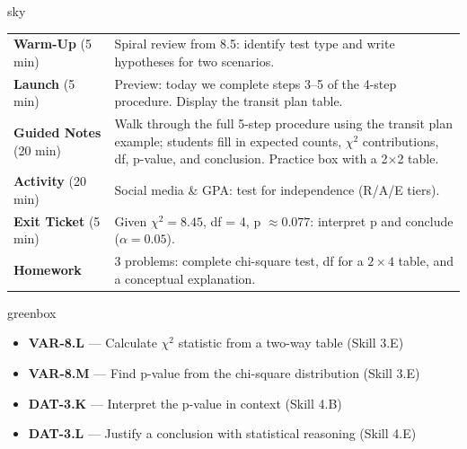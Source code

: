 \documentclass[10pt]{article}
\begin{document}
\begin{skillbox}{sky}
\renewcommand{\arraystretch}{1.3}
\begin{tabular}{@{} p{1.2in} p{4.7in} @{}}
    \textbf{Warm-Up} (5 min)       & Spiral review from 8.5: identify test type and write hypotheses for two scenarios. \\
    \textbf{Launch} (5 min)        & Preview: today we complete steps 3--5 of the 4-step procedure. Display the transit plan table. \\
    \textbf{Guided Notes} (20 min) & Walk through the full 5-step procedure using the transit plan example; students fill in expected counts, $\chi^2$ contributions, df, p-value, and conclusion. Practice box with a 2$\times$2 table. \\
    \textbf{Activity} (20 min)     & Social media \& GPA: test for independence (R/A/E tiers). \\
    \textbf{Exit Ticket} (5 min)   & Given $\chi^2 = 8.45$, df = 4, p $\approx 0.077$: interpret p and conclude ($\alpha = 0.05$). \\
    \textbf{Homework}              & 3 problems: complete chi-square test, df for a $2\times4$ table, and a conceptual explanation. \\
\end{tabular}
\end{skillbox}

\begin{skillbox}{greenbox}
\begin{itemize}
    \item \textbf{VAR-8.L} --- Calculate $\chi^2$ statistic from a two-way table (Skill 3.E)
    \item \textbf{VAR-8.M} --- Find p-value from the chi-square distribution (Skill 3.E)
    \item \textbf{DAT-3.K} --- Interpret the p-value in context (Skill 4.B)
    \item \textbf{DAT-3.L} --- Justify a conclusion with statistical reasoning (Skill 4.E)
\end{itemize}
\end{skillbox}
\end{document}
